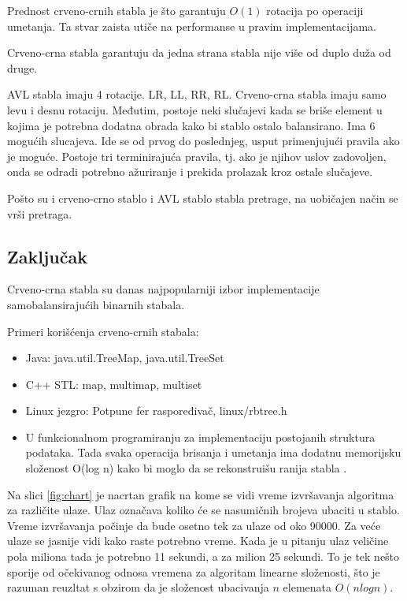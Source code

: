 \documentclass[a4paper]{article}
\begin{document}
    Prednost crveno-crnih stabla je što garantuju $O(1)$ rotacija po operaciji umetanja. 
    Ta stvar zaista utiče na performanse u pravim implementacijama.

    Crveno-crna stabla garantuju da jedna strana stabla nije više od duplo duža od druge.

    AVL stabla imaju 4 rotacije. LR, LL, RR, RL.
    Crveno-crna stabla imaju samo levu i desnu rotaciju. Međutim, postoje neki slučajevi kada se briše element u kojima je potrebna dodatna obrada
    kako bi stablo ostalo balansirano.
    Ima 6 mogućih slucajeva. Ide se od prvog do poslednjeg, usput primenjujući pravila ako je moguće. Postoje tri terminirajuća pravila, tj. 
    ako je njihov uslov zadovoljen, onda se odradi potrebno ažuriranje i prekida prolazak kroz ostale slučajeve.
    
    Pošto su i crveno-crno stablo i AVL stablo stabla pretrage, na uobičajen način se vrši pretraga.

\subsection{Zaključak}
Crveno-crna stabla su danas najpopularniji izbor implementacije samobalansirajućih binarnih stabala.

Primeri korišćenja crveno-crnih stabala:
\begin{itemize}
    \item  Java: java.util.TreeMap, java.util.TreeSet
    \item C++ STL: map, multimap, multiset \cite{gcc}
    \item Linux jezgro: Potpune fer raspoređivač, linux/rbtree.h
    \item U funkcionalnom programiranju za implementaciju postojanih struktura podataka. Tada svaka operacija brisanja i umetanja ima dodatnu memorijsku složenost O(log n) kako bi moglo da se rekonstruišu ranija stabla \cite{persistent}.
\end{itemize}

Na slici \ref{fig:chart} je nacrtan grafik na kome se vidi vreme  izvršavanja algoritma za različite ulaze.
Ulaz označava koliko će se nasumičnih brojeva ubaciti u stablo.
Vreme izvršavanja počinje da bude osetno tek za ulaze od oko 90000.
Za veće ulaze se jasnije vidi kako raste potrebno vreme. Kada je u pitanju
ulaz veličine pola miliona tada je potrebno 11 sekundi, a za milion 25 sekundi.
To je tek nešto sporije od očekivanog odnosa vremena za algoritam linearne složenosti, što je 
razuman reuzltat s obzirom da je složenost ubacivanja $n$ elemenata $O(n logn)$.
\end{document}
